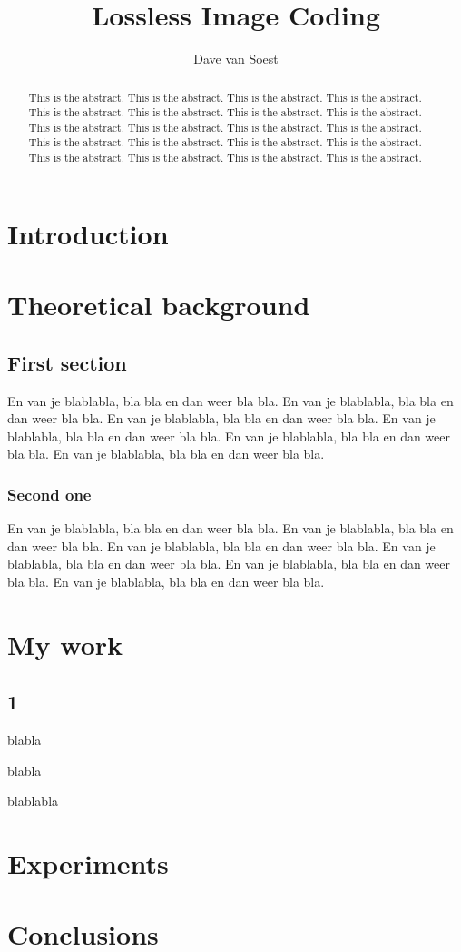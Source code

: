 \documentclass[twoside,openright]{uva-bachelor-thesis}
\title{Lossless Image Coding}
\author{Dave van Soest}
\begin{document}
\maketitle

\begin{abstract}
This is the abstract. This is the abstract. This is the abstract. This is the abstract. 
This is the abstract. This is the abstract. This is the abstract. This is the abstract. 
This is the abstract. This is the abstract. This is the abstract. This is the abstract. 
This is the abstract. This is the abstract. This is the abstract. This is the abstract. 
This is the abstract. This is the abstract. This is the abstract. This is the abstract. 
\end{abstract}


\tableofcontents

\chapter{Introduction}

\chapter{Theoretical background}

\section{First section}

En van je blablabla, bla bla en dan weer bla bla. En van je blablabla,
bla bla en dan weer bla bla. En van je blablabla, bla bla en dan weer
bla bla. En van je blablabla, bla bla en dan weer bla bla. En van je
blablabla, bla bla en dan weer bla bla. En van je blablabla, bla bla
en dan weer bla bla.

\subsection{Second one}

En van je blablabla, bla bla en dan weer bla bla. En van je blablabla,
bla bla en dan weer bla bla. En van je blablabla, bla bla en dan weer
bla bla. En van je blablabla, bla bla en dan weer bla bla. En van je
blablabla, bla bla en dan weer bla bla. En van je blablabla, bla bla
en dan weer bla bla.


\chapter{My work}

\section{1}
blabla

\newpage


blabla

\newpage

blablabla



\chapter{Experiments}

\chapter{Conclusions}
\end{document}
